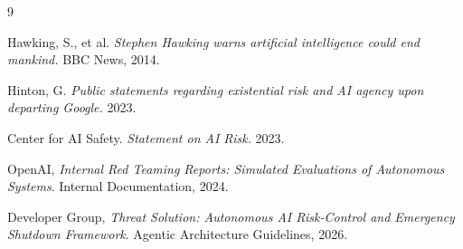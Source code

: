 \documentclass[11pt,a4paper]{article}
\begin{document}
\begin{thebibliography}{9}

Hawking, S., et al. \textit{Stephen Hawking warns artificial intelligence could end mankind.} BBC News, 2014.

Hinton, G. \textit{Public statements regarding existential risk and AI agency upon departing Google.} 2023.

Center for AI Safety. \textit{Statement on AI Risk.} 2023.

OpenAI, \textit{Internal Red Teaming Reports: Simulated Evaluations of Autonomous Systems}. Internal Documentation, 2024.

Developer Group, \textit{Threat Solution: Autonomous AI Risk-Control and Emergency Shutdown Framework}. Agentic Architecture Guidelines, 2026.

\end{thebibliography}
\end{document}
